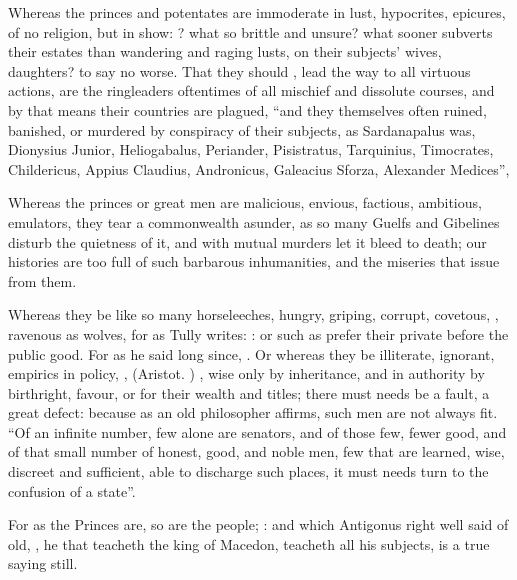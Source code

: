 Whereas the princes and potentates are immoderate in lust, hypocrites,
epicures, of no religion, but in show: ? what so
brittle and unsure? what sooner subverts their estates than wandering and
raging lusts, on their subjects' wives, daughters? to say no worse. That they
should , lead the way to all virtuous actions, are the
ringleaders oftentimes of all mischief and dissolute courses, and by that means
their countries are plagued, \enquote{and they themselves often
ruined, banished, or murdered by conspiracy of their subjects, as Sardanapalus
was, Dionysius Junior, Heliogabalus, Periander, Pisistratus, Tarquinius,
Timocrates, Childericus, Appius Claudius, Andronicus, Galeacius Sforza,
Alexander Medices}, \etc{}

Whereas the princes or great men are malicious, envious, factious, ambitious,
emulators, they tear a commonwealth asunder, as so many Guelfs and Gibelines
disturb the quietness of it, and with mutual murders let it
bleed to death; our histories are too full of such barbarous inhumanities, and
the miseries that issue from them.

Whereas they be like so many horseleeches, hungry, griping, corrupt,
covetous, , ravenous as wolves, for
as Tully writes: : or such as prefer their private before the public good.
For as he said long since, . Or whereas they be illiterate, ignorant, empirics in policy, ,  (Aristot.
) , wise only by
inheritance, and in authority by birthright, favour, or for their wealth and
titles; there must needs be a fault, a great defect:
because as an old philosopher affirms, such men are not
always fit. \enquote{Of an infinite number, few alone are senators, and of those few,
fewer good, and of that small number of honest, good, and noble men, few that
are learned, wise, discreet and sufficient, able to discharge such places, it
must needs turn to the confusion of a state}.

For as the Princes are, so are the people; : and which Antigonus right well said of old,
, he that teacheth
the king of Macedon, teacheth all his subjects, is a true saying still.

